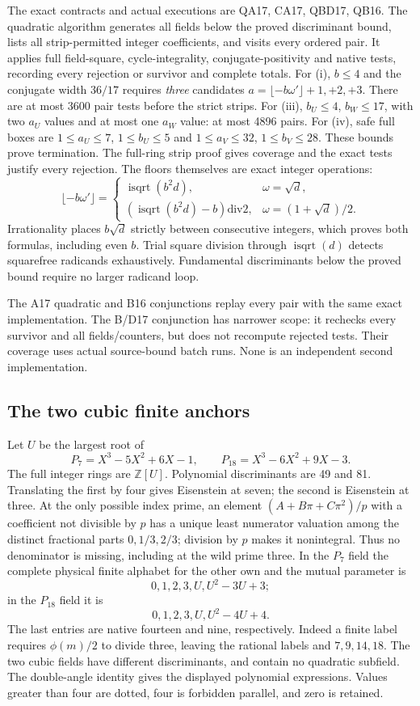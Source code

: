 \documentclass[11pt]{article}
\newcommand{\ZZ}{\mathbb Z}
\newcommand{\supp}[1]{\textsf{#1}}
\begin{document}
The exact contracts and actual executions are \supp{QA17},
\supp{CA17}, \supp{QBD17}, \supp{QB16}.
The quadratic algorithm generates all fields below the proved
discriminant bound, lists all strip-permitted integer coefficients,
and visits every ordered pair. It applies full field-square,
cycle-integrality, conjugate-positivity and native tests, recording
every rejection or survivor and complete totals.
For (i), $b\le4$ and the conjugate width $36/17$ requires
\emph{three} candidates
$a=\lfloor-b\omega'\rfloor+1,+2,+3$.
There are at most 3600 pair tests before the strict strips.
For (iii), $b_U\le4$, $b_W\le17$, with two $a_U$ values
and at most one $a_W$ value: at most 4896 pairs.
For (iv), safe full boxes are
$1\le a_U\le7$, $1\le b_U\le5$ and
$1\le a_V\le32$, $1\le b_V\le28$.
These bounds prove termination. The full-ring strip proof gives
coverage and the exact tests justify every rejection.
The floors themselves are exact integer operations:
\[
 \lfloor-b\omega'\rfloor=
 \begin{cases}
 \operatorname{isqrt}(b^2d),&\omega=\sqrt d,\\
 (\operatorname{isqrt}(b^2d)-b)\mathbin{\mathrm{div}}2,
       &\omega=(1+\sqrt d)/2.
 \end{cases}
\]
Irrationality places $b\sqrt d$ strictly between consecutive integers,
which proves both formulas, including even $b$.
Trial square division through $\operatorname{isqrt}(d)$ detects
squarefree radicands exhaustively. Fundamental discriminants below the
proved bound require no larger radicand loop.

The A17 quadratic and B16 conjunctions replay every pair with the
same exact implementation. The B/D17 conjunction has narrower scope:
it rechecks every survivor and all fields/counters, but does not
recompute rejected tests. Their coverage uses actual source-bound
batch runs. None is an independent second implementation.

\subsection{The two cubic finite anchors}
Let $U$ be the largest root of
\[
 P_7=X^3-5X^2+6X-1,\qquad P_{18}=X^3-6X^2+9X-3.
\]
The full integer rings are $\ZZ[U]$. Polynomial discriminants are
49 and 81. Translating the first by four gives Eisenstein at
seven; the second is Eisenstein at three.
At the only possible index prime, an element
$(A+B\pi+C\pi^2)/p$ with a coefficient not divisible by $p$
has a unique least numerator valuation among the distinct fractional
parts $0,1/3,2/3$; division by $p$ makes it nonintegral.
Thus no denominator is missing, including at the wild prime three.
In the $P_7$ field the complete physical finite alphabet for the other
own and the mutual parameter is
\[
 0,1,2,3,U,U^2-3U+3;
\]
in the $P_{18}$ field it is
\[
 0,1,2,3,U,U^2-4U+4.
\]
The last entries are native fourteen and nine, respectively.
Indeed a finite label requires $\phi(m)/2$ to divide three, leaving
the rational labels and $7,9,14,18$. The two cubic fields have different
discriminants, and contain no quadratic subfield. The double-angle
identity gives the displayed polynomial expressions. Values greater
than four are dotted, four is forbidden parallel, and zero is retained.
\end{document}
